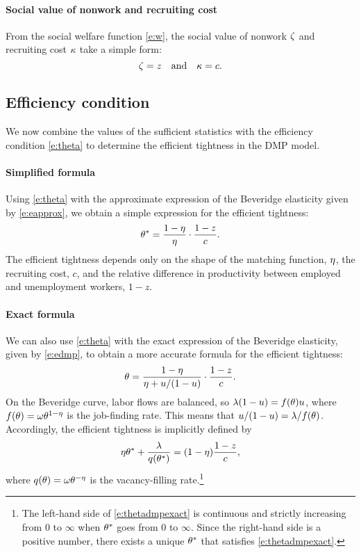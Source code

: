 \documentclass[letterpaper,12pt,leqno]{article}
\begin{document}
\paragraph{Social value of nonwork and recruiting cost} From the social welfare function \eqref{e:w}, the social value of nonwork $\zeta$ and recruiting cost $\kappa$ take a simple form:
\begin{equation}
\zeta = z \quad\text{and}\quad \kappa = c.
\label{e:zkdmp}\end{equation}

\subsection{Efficiency condition}

We now combine the values of the sufficient statistics with the efficiency condition \eqref{e:theta} to determine the efficient tightness in the DMP model. 

\paragraph{Simplified formula} Using \eqref{e:theta} with the approximate expression of the Beveridge elasticity given by \eqref{e:eapprox}, we obtain a simple expression for the efficient tightness:
\begin{equation}
\theta^* =  \frac{1-\eta}{\eta} \cdot \frac{1-z}{c}.
\label{e:thetadmpapprox}\end{equation}
The efficient tightness depends only on the shape of the matching function, $\eta$, the recruiting cost, $c$, and the relative difference in productivity between employed and unemployment workers, $1-z$.

\paragraph{Exact formula} We can also use \eqref{e:theta} with the exact expression of the Beveridge elasticity, given by \eqref{e:edmp}, to obtain a more accurate formula for the efficient  tightness:
\begin{equation*}
\theta =  \frac{1-\eta}{\eta+u/(1-u)}\cdot \frac{1-z}{c}.
\end{equation*}
On the Beveridge curve, labor flows are balanced, so $\lambda (1-u) = f(\theta) u $, where $f(\theta) = \omega \theta^{1-\eta}$ is the job-finding rate. This means that $u/(1-u) =\lambda/f(\theta)$. Accordingly, the efficient tightness is implicitly defined by
\begin{equation}
\eta\theta^* + \frac{\lambda}{q(\theta^*)} = (1-\eta) \frac{1-z}{c},
\label{e:thetadmpexact}\end{equation}
where $q(\theta) = \omega \theta^{-\eta}$ is the vacancy-filling rate.\footnote{The left-hand side of \eqref{e:thetadmpexact} is continuous and strictly increasing from $0$ to $\infty$ when $\theta^*$ goes from $0$ to $\infty$. Since the right-hand side is a positive number, there exists a unique $\theta^*$ that satisfies \eqref{e:thetadmpexact}.}
\end{document}
